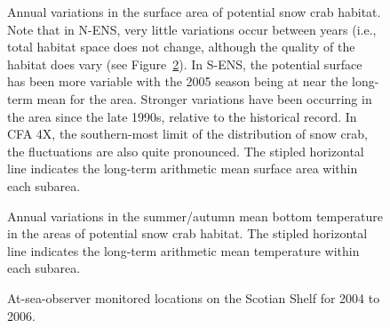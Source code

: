 \documentclass[11pt]{article}
\newcommand*{\D}{.}  %
\begin{document}
\begin{figure}[ht]
\begin{center}
\end{center}
\caption{Annual variations in the surface area of potential snow crab habitat. Note that in N-ENS, very little variations occur between years (i.e., total habitat space does not change, although the quality of the habitat does vary (see Figure~\ref{ts.habitat.surfacearea.temperatures}). In S-ENS, the potential surface has been more variable with the 2005 season being at near the long-term mean for the area. Stronger variations have been occurring in the area since the late 1990s, relative to the  historical record. In CFA 4X, the southern-most limit of the distribution of snow crab, the fluctuations are also quite pronounced. The stipled horizontal line indicates the long-term arithmetic mean surface area within each subarea.}
\label{ts.habitat.surfacearea}
\end{figure}


\begin{figure}[ht]
\begin{center}
\end{center}
\caption{Annual variations in the summer/autumn mean bottom temperature in the areas of potential snow crab habitat. The stipled horizontal line indicates the long-term arithmetic mean temperature within each subarea.}
\label{ts.habitat.surfacearea.temperatures}
\end{figure}




\newpage
\begin{figure}[h]
\begin{center}
  \begin{minipage}{4in}
  \end{minipage}
  \begin{minipage}{4in}
  \end{minipage}
  \begin{minipage}{4in}
  \end{minipage}
\end{center}
\caption{At-sea-observer monitored locations on the Scotian Shelf for 2004 to 2006.}
\label{observer.locations}
\end{figure}
\end{document}
